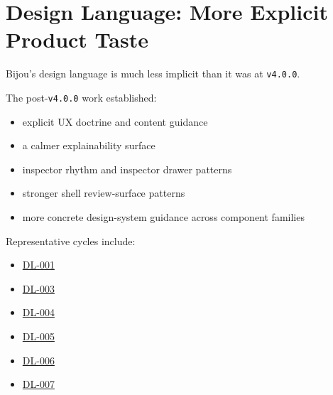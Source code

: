 \section{Design Language: More Explicit Product Taste}\label{record-275-design-language-more-explicit-product-taste}

Bijou's design language is much less implicit than it was at \texttt{v\allowbreak{}4\allowbreak{}.\allowbreak{}0\allowbreak{}.\allowbreak{}0}.

The post-\texttt{v\allowbreak{}4\allowbreak{}.\allowbreak{}0\allowbreak{}.\allowbreak{}0} work established:

\begin{itemize}
\tightlist
\item
  explicit UX doctrine and content guidance
\item
  a calmer explainability surface
\item
  inspector rhythm and inspector drawer patterns
\item
  stronger shell review-surface patterns
\item
  more concrete design-system guidance across component families
\end{itemize}

Representative cycles include:

\begin{itemize}
\tightlist
\item
  \href{https://github.com/flyingrobots/bijou/blob/cbd70612140e7a450d764b3c7be1c6af878b99bc/docs/design/DL-001-capture-design-language-doctrine.md}{DL-001}
\item
  \href{https://github.com/flyingrobots/bijou/blob/cbd70612140e7a450d764b3c7be1c6af878b99bc/docs/design/DL-003-prove-canonical-patterns-in-shared-surfaces.md}{DL-003}
\item
  \href{https://github.com/flyingrobots/bijou/blob/cbd70612140e7a450d764b3c7be1c6af878b99bc/docs/design/DL-004-prove-drawer-rhythm-and-notice-rows.md}{DL-004}
\item
  \href{https://github.com/flyingrobots/bijou/blob/cbd70612140e7a450d764b3c7be1c6af878b99bc/docs/design/DL-005-prove-inspector-and-guided-flow-rhythm.md}{DL-005}
\item
  \href{https://github.com/flyingrobots/bijou/blob/cbd70612140e7a450d764b3c7be1c6af878b99bc/docs/design/DL-006-prove-inspector-panel-rhythm.md}{DL-006}
\item
  \href{https://github.com/flyingrobots/bijou/blob/cbd70612140e7a450d764b3c7be1c6af878b99bc/docs/design/DL-007-promote-inspector-panel-block.md}{DL-007}
\end{itemize}

